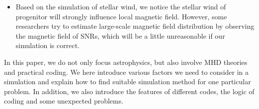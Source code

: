 \begin{itemize}
   \item Based on the simulation of stellar wind, we notice the stellar wind of progenitor will
   strongly influence local magnetic field.
   However, some researchers try to estimate large-scale magnetic field distribution by
   observing the magnetic field of SNRs, which will be a little unreasonable if our simulation
   is correct.
\end{itemize}

   In this paper, we do not only focus astrophysics, but also involve MHD theories and practical
   coding.
   We here introduce various factors we need to consider in a simulation and explain how to find
   suitable simulation method for one particular problem.
   In addition, we also introduce the features of different codes, the logic of coding and some
   unexpected problems.

